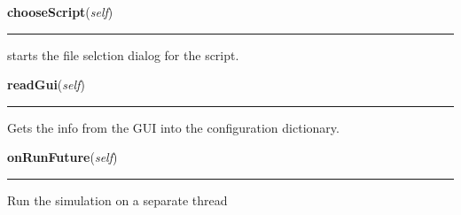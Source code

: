     \label{epigrass:MainPanel_Impl:chooseScript}

    \vspace{0.5ex}

    \begin{boxedminipage}{\textwidth}

    \raggedright \textbf{chooseScript}(\textit{self})

    \vspace{-1.5ex}

    \rule{\textwidth}{0.5\fboxrule}
    starts the file selction dialog for the script.

    \vspace{1ex}

    \end{boxedminipage}

    \label{epigrass:MainPanel_Impl:readGui}

    \vspace{0.5ex}

    \begin{boxedminipage}{\textwidth}

    \raggedright \textbf{readGui}(\textit{self})

    \vspace{-1.5ex}

    \rule{\textwidth}{0.5\fboxrule}
    Gets the info from the GUI into the configuration dictionary.

    \vspace{1ex}

    \end{boxedminipage}

    \label{epigrass:MainPanel_Impl:onRunFuture}

    \vspace{0.5ex}

    \begin{boxedminipage}{\textwidth}

    \raggedright \textbf{onRunFuture}(\textit{self})

    \vspace{-1.5ex}

    \rule{\textwidth}{0.5\fboxrule}
    Run the simulation on a separate thread

    \vspace{1ex}

    \end{boxedminipage}

